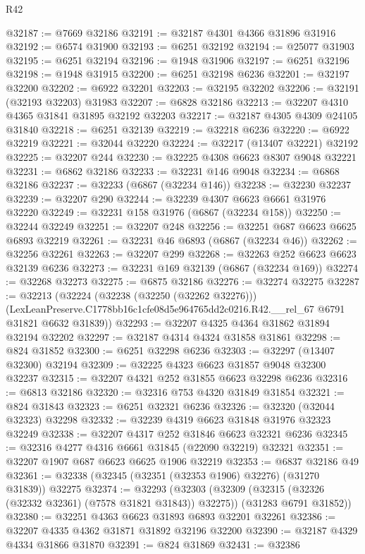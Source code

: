 \begin{lexlean}{R42}
\begin{coremodule}
{@32187 := @7669 @32186
@32191 := @32187 @4301 @4366 @31896 @31916
@32192 := @6574 @31900
@32193 := @6251 @32192
@32194 := @25077 @31903
@32195 := @6251 @32194
@32196 := @1948 @31906
@32197 := @6251 @32196
@32198 := @1948 @31915
@32200 := @6251 @32198 @6236
@32201 := @32197 @32200
@32202 := @6922 @32201
@32203 := @32195 @32202
@32206 := @32191 (@32193 @32203) @31983
@32207 := @6828 @32186
@32213 := @32207 @4310 @4365 @31841 @31895 @32192 @32203
@32217 := @32187 @4305 @4309 @24105 @31840
@32218 := @6251 @32139
@32219 := @32218 @6236
@32220 := @6922 @32219
@32221 := @32044 @32220
@32224 := @32217 (@13407 @32221) @32192
@32225 := @32207 @244
@32230 := @32225 @4308 @6623 @8307 @9048 @32221
@32231 := @6862 @32186
@32233 := @32231 @146 @9048
@32234 := @6868 @32186
@32237 := @32233 (@6867 (@32234 @146))
@32238 := @32230 @32237
@32239 := @32207 @290
@32244 := @32239 @4307 @6623 @6661 @31976 @32220
@32249 := @32231 @158 @31976 (@6867 (@32234 @158))
@32250 := @32244 @32249
@32251 := @32207 @248
@32256 := @32251 @687 @6623 @6625 @6893 @32219
@32261 := @32231 @46 @6893 (@6867 (@32234 @46))
@32262 := @32256 @32261
@32263 := @32207 @299
@32268 := @32263 @252 @6623 @6623 @32139 @6236
@32273 := @32231 @169 @32139 (@6867 (@32234 @169))
@32274 := @32268 @32273
@32275 := @6875 @32186
@32276 := @32274 @32275
@32287 := @32213
    (@32224
      (@32238 (@32250 (@32262 @32276)))
      (LexLeanPreserve.C1778bb16c1cfe08d5e964765dd2c0216.R42.__rel_67 @6791 @31821 @6632 @31839))
@32293 := @32207 @4325 @4364 @31862 @31894 @32194 @32202
@32297 := @32187 @4314 @4324 @31858 @31861
@32298 := @824 @31852
@32300 := @6251 @32298 @6236
@32303 := @32297 (@13407 @32300) @32194
@32309 := @32225 @4323 @6623 @31857 @9048 @32300 @32237
@32315 := @32207 @4321 @252 @31855 @6623 @32298 @6236
@32316 := @6813 @32186
@32320 := @32316 @753 @4320 @31849 @31854
@32321 := @824 @31843
@32323 := @6251 @32321 @6236
@32326 := @32320 (@32044 @32323) @32298
@32332 := @32239 @4319 @6623 @31848 @31976 @32323 @32249
@32338 := @32207 @4317 @252 @31846 @6623 @32321 @6236
@32345 := @32316 @4277 @4316 @6661 @31845 (@22090 @32219) @32321
@32351 := @32207 @1907 @687 @6623 @6625 @1906 @32219
@32353 := @6837 @32186 @49
@32361 := @32338 (@32345 (@32351 (@32353 @1906) @32276) (@31270 @31839)) @32275
@32374 := @32293
    (@32303
      (@32309 (@32315 (@32326 (@32332 @32361) (@7578 @31821 @31843)) @32275))
      (@31283 @6791 @31852))
@32380 := @32251 @4363 @6623 @31893 @6893 @32201 @32261
@32386 := @32207 @4335 @4362 @31871 @31892 @32196 @32200
@32390 := @32187 @4329 @4334 @31866 @31870
@32391 := @824 @31869
@32431 := @32386
}
\end{coremodule}
\end{lexlean}
